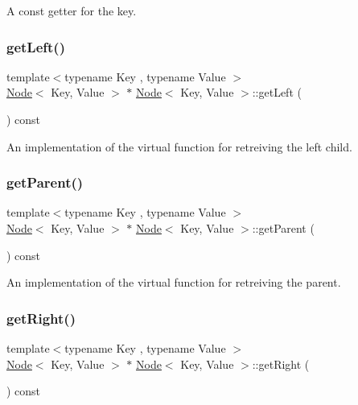 A const getter for the key. \mbox{\label{classNode_aaa2c1b8458c0df8489ac991cf03d3c33}} 
\subsubsection{\texorpdfstring{get\+Left()}{getLeft()}}
{\footnotesize\ttfamily template$<$typename Key , typename Value $>$ \\
\mbox{\hyperlink{classNode}{Node}}$<$ Key, Value $>$ $\ast$ \mbox{\hyperlink{classNode}{Node}}$<$ Key, Value $>$\+::get\+Left (\begin{DoxyParamCaption}{ }\end{DoxyParamCaption}) const\hspace{0.3cm}{\ttfamily [virtual]}}

An implementation of the virtual function for retreiving the left child. \mbox{\label{classNode_a69339fc2a76f5b4456ecc930703f93cd}} 
\subsubsection{\texorpdfstring{get\+Parent()}{getParent()}}
{\footnotesize\ttfamily template$<$typename Key , typename Value $>$ \\
\mbox{\hyperlink{classNode}{Node}}$<$ Key, Value $>$ $\ast$ \mbox{\hyperlink{classNode}{Node}}$<$ Key, Value $>$\+::get\+Parent (\begin{DoxyParamCaption}{ }\end{DoxyParamCaption}) const\hspace{0.3cm}{\ttfamily [virtual]}}

An implementation of the virtual function for retreiving the parent. \mbox{\label{classNode_a148e0ef6995e7c8aa344779e0cca507a}} 
\subsubsection{\texorpdfstring{get\+Right()}{getRight()}}
{\footnotesize\ttfamily template$<$typename Key , typename Value $>$ \\
\mbox{\hyperlink{classNode}{Node}}$<$ Key, Value $>$ $\ast$ \mbox{\hyperlink{classNode}{Node}}$<$ Key, Value $>$\+::get\+Right (\begin{DoxyParamCaption}{ }\end{DoxyParamCaption}) const\hspace{0.3cm}{\ttfamily [virtual]}}

